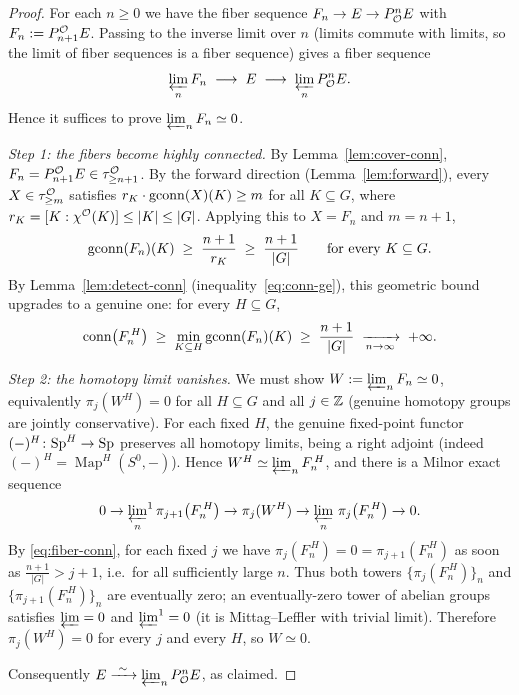 \begin{proof}
For each $n\ge0$ we have the fiber sequence
$F_n\to E\to P^n_{\mathcal{O}} E$ with $F_n:=P^{\mathcal{O}}_{n+1}E$. Passing to the inverse
limit over $n$ (limits commute with limits, so the limit of fiber sequences is a
fiber sequence) gives a fiber sequence
\[
\varprojlim_n F_n\;\longrightarrow\;E\;\longrightarrow\;\varprojlim_n P^n_{\mathcal{O}} E .
\]
Hence it suffices to prove $\varprojlim_n F_n\simeq 0$.

\emph{Step 1: the fibers become highly connected.}
By Lemma~\ref{lem:cover-conn}, $F_n=P^{\mathcal{O}}_{n+1}E\in\tau^{\mathcal{O}}_{\ge n+1}$.
By the forward direction (Lemma~\ref{lem:forward}), every
$X\in\tau^{\mathcal{O}}_{\ge m}$ satisfies $r_K\cdot\operatorname{gconn}(X)(K)\ge m$ for all
$K\subseteq G$, where $r_K=[K:\chi^{\mathcal{O}}(K)]\le|K|\le|G|$. Applying this to
$X=F_n$ and $m=n+1$,
\begin{equation}\label{eq:fiber-gconn}
\operatorname{gconn}(F_n)(K)\;\ge\;\frac{n+1}{r_K}\;\ge\;\frac{n+1}{|G|}\qquad
\text{for every }K\subseteq G .
\end{equation}
By Lemma~\ref{lem:detect-conn} (inequality~\eqref{eq:conn-ge}), this geometric
bound upgrades to a genuine one: for every $H\subseteq G$,
\begin{equation}\label{eq:fiber-conn}
\operatorname{conn}\bigl(F_n^{\,H}\bigr)\;\ge\;\min_{K\subseteq H}\operatorname{gconn}(F_n)(K)
\;\ge\;\frac{n+1}{|G|}\;\xrightarrow[n\to\infty]{}\;+\infty .
\end{equation}

\emph{Step 2: the homotopy limit vanishes.}
We must show $W:=\varprojlim_n F_n\simeq 0$, equivalently $\pi_j(W^H)=0$ for all
$H\subseteq G$ and all $j\in\mathbb{Z}$ (genuine homotopy groups are jointly
conservative). For each fixed $H$, the genuine fixed-point functor
$(-)^H\colon\mathrm{Sp}^H\to\mathrm{Sp}$ preserves all homotopy limits, being a right
adjoint (indeed $(-)^H=\operatorname{Map}^H(S^0,-)$). Hence
$W^H\simeq\varprojlim_n F_n^{\,H}$, and there is a Milnor exact sequence
\[
0\to{\varprojlim_n}^{1}\,\pi_{j+1}\bigl(F_n^{\,H}\bigr)\to\pi_j(W^H)\to
\varprojlim_n\,\pi_{j}\bigl(F_n^{\,H}\bigr)\to 0 .
\]
By \eqref{eq:fiber-conn}, for each fixed $j$ we have
$\pi_{j}(F_n^{\,H})=0=\pi_{j+1}(F_n^{\,H})$ as soon as
$\frac{n+1}{|G|}>j+1$, i.e.\ for all sufficiently large $n$. Thus both towers
$\{\pi_{j}(F_n^{\,H})\}_n$ and $\{\pi_{j+1}(F_n^{\,H})\}_n$ are eventually zero;
an eventually-zero tower of abelian groups satisfies $\varprojlim=0$ and
$\varprojlim^1=0$ (it is Mittag--Leffler with trivial limit). Therefore
$\pi_j(W^H)=0$ for every $j$ and every $H$, so $W\simeq 0$.

Consequently $E\xrightarrow{\ \sim\ }\varprojlim_n P^n_\qfiveaO E$, as claimed.
\end{proof}


